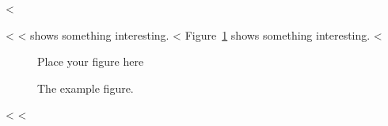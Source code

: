 <%

<%
<%
 shows something interesting.
<%
Figure~\ref{fig:label} shows something interesting.
<%

\begin{figure}
  \centering
  Place your figure here
  \caption{The example figure.}
  \label{fig:label}
\end{figure}
<%
<%
